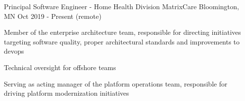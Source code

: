 \begin{cventries}

  \cventry
    {Principal Software Engineer - Home Health Division} %
    {MatrixCare} %
    {Bloomington, MN} %
    {Oct 2019 - Present (remote)} %
    {
      \begin{cvitems} %
        \item {Member of the enterprise architecture team, responsible for directing initiatives targeting software quality, proper architectural standards and improvements to devops}
        \item {Technical oversight for offshore teams}
        \item {Serving as acting manager of the platform operations team, responsible for driving platform modernization initiatives}
      \end{cvitems}
    }
    

\end{cventries}
